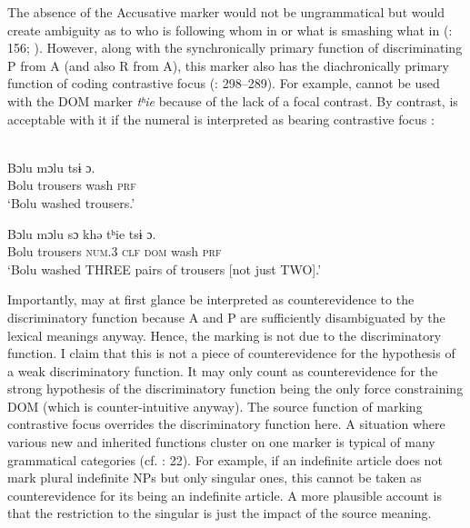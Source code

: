\documentclass[output=paper]{langsci/langscibook}
\begin{document}
The absence of the Accusative marker would not be ungrammatical but would create ambiguity as to who is following whom in  or what is smashing what in  (\citealt{Matisoff1973}: 156; \citealt{Gerner2008}). However, along with the synchronically primary function of discriminating P from A (and also R from A), this marker also has the diachronically primary function of coding contrastive focus (\citealt{Gerner2008}: 298–289). For example,  cannot be used with the DOM marker \textit{tʰ}\textit{ie} because of the lack of a focal contrast. By contrast,  is acceptable with it if the numeral is interpreted as bearing contrastive focus \citep[299]{Gerner2008}:

\ea\label{ex:serzant:27}
\\
\ea\label{ex:serzant:27a}
\gll Bɔlu   mɔlu     tsɨ   ɔ.\\
     Bolu  trousers  wash  \textsc{prf}\\
\glt ‘Bolu washed trousers.’

\ex\label{ex:serzant:27b}
\gll  Bɔlu   mɔlu     sɔ   khǝ   tʰie   tsɨ   ɔ.\\
     Bolu  trousers  \textsc{num.}3  \textsc{clf}  \textsc{dom}   wash   \textsc{prf}\\
\glt ‘Bolu washed THREE pairs of trousers [not just TWO].’
\z
\z

Importantly,  may at first glance be interpreted as counterevidence to the discriminatory function because A and P are sufficiently disambiguated by the lexical meanings anyway. Hence, the marking is not due to the discriminatory function. I claim that this is not a piece of counterevidence for the hypothesis of a weak discriminatory function. It may only count as counterevidence for the strong hypothesis of the discriminatory function being the only force constraining DOM (which is counter-intuitive anyway). The source function of marking contrastive focus overrides the discriminatory function here. A situation where various new and inherited functions cluster on one marker is typical of many grammatical categories (cf. \citealt{Hopper1991}: 22). For example, if an indefinite article does not mark plural indefinite NPs but only singular ones, this cannot be taken as counterevidence for its being an indefinite article. A more plausible account is that the restriction to the singular is just the impact of the source meaning. 
\end{document}

